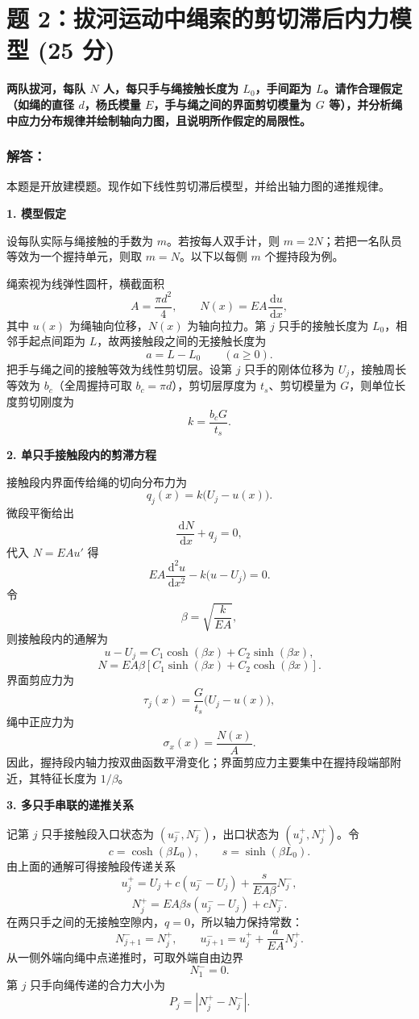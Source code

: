 \documentclass[11pt,a4paper]{ctexrep}
\newcommand{\diff}{\,\mathrm{d}}
\begin{document}
{%


\section*{题 2：拔河运动中绳索的剪切滞后内力模型 (25 分)}

\textbf{两队拔河，每队 $N$ 人，每只手与绳接触长度为 $L_0$，手间距为 $L$。请作合理假定（如绳的直径 $d$，杨氏模量 $E$，手与绳之间的界面剪切模量为 $G$ 等），并分析绳中应力分布规律并绘制轴向力图，且说明所作假定的局限性。}

\subsubsection*{解答：}

本题是开放建模题。现作如下线性剪切滞后模型，并给出轴力图的递推规律。

\textbf{1. 模型假定}

设每队实际与绳接触的手数为 $m$。若按每人双手计，则 $m=2N$；若把一名队员等效为一个握持单元，则取 $m=N$。以下以每侧 $m$ 个握持段为例。

绳索视为线弹性圆杆，横截面积
\[
A=\frac{\pi d^2}{4},\qquad N(x)=EA\frac{\diff u}{\diff x},
\]
其中 $u(x)$ 为绳轴向位移，$N(x)$ 为轴向拉力。第 $j$ 只手的接触长度为 $L_0$，相邻手起点间距为 $L$，故两接触段之间的无接触长度为
\[
a=L-L_0\qquad (a\ge 0).
\]
把手与绳之间的接触等效为线性剪切层。设第 $j$ 只手的刚体位移为 $U_j$，接触周长等效为 $b_c$（全周握持可取 $b_c=\pi d$），剪切层厚度为 $t_s$、剪切模量为 $G$，则单位长度剪切刚度为
\[
k=\frac{b_cG}{t_s}.
\]

\textbf{2. 单只手接触段内的剪滞方程}

接触段内界面传给绳的切向分布力为
\[
q_j(x)=k\bigl(U_j-u(x)\bigr).
\]
微段平衡给出
\[
\frac{\diff N}{\diff x}+q_j=0,
\]
代入 $N=EAu'$ 得
\[
EA\frac{\diff^2u}{\diff x^2}-k\bigl(u-U_j\bigr)=0.
\]
令
\[
\beta=\sqrt{\frac{k}{EA}},
\]
则接触段内的通解为
\[
u-U_j=C_1\cosh(\beta x)+C_2\sinh(\beta x),
\]
\[
N=EA\beta\left[C_1\sinh(\beta x)+C_2\cosh(\beta x)\right].
\]
界面剪应力为
\[
\tau_j(x)=\frac{G}{t_s}\bigl(U_j-u(x)\bigr),
\]
绳中正应力为
\[
\sigma_x(x)=\frac{N(x)}{A}.
\]
因此，握持段内轴力按双曲函数平滑变化；界面剪应力主要集中在握持段端部附近，其特征长度为 $1/\beta$。

\textbf{3. 多只手串联的递推关系}

记第 $j$ 只手接触段入口状态为 $(u_j^-,N_j^-)$，出口状态为 $(u_j^+,N_j^+)$。令
\[
c=\cosh(\beta L_0),\qquad s=\sinh(\beta L_0).
\]
由上面的通解可得接触段传递关系
\[
u_j^+=U_j+c(u_j^--U_j)+\frac{s}{EA\beta}N_j^-,
\]
\[
N_j^+=EA\beta s(u_j^--U_j)+cN_j^-.
\]
在两只手之间的无接触空隙内，$q=0$，所以轴力保持常数：
\[
N_{j+1}^-=N_j^+,\qquad
u_{j+1}^-=u_j^++\frac{a}{EA}N_j^+.
\]
从一侧外端向绳中点递推时，可取外端自由边界
\[
N_1^-=0.
\]
第 $j$ 只手向绳传递的合力大小为
\[
P_j=\left|N_j^+-N_j^-\right|.
\]

}
\end{document}
